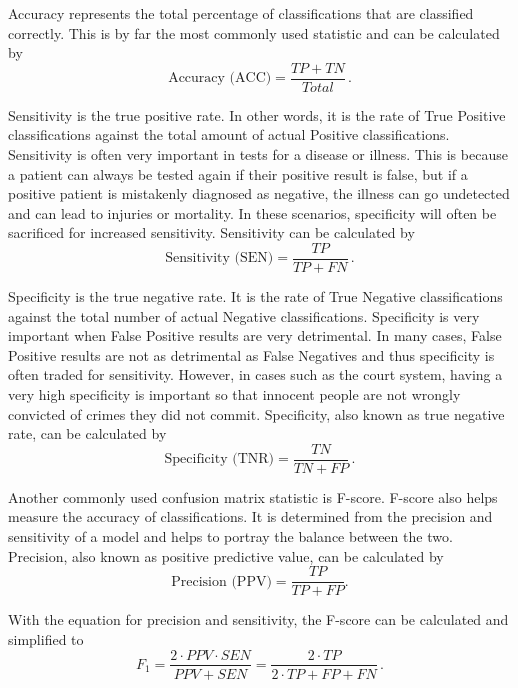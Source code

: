 \documentclass{article}
\begin{document}
Accuracy represents the total percentage of classifications that are classified correctly. This is by far the most commonly used statistic and can be calculated by
\begin{equation}
	\text{Accuracy (ACC)} = \frac{TP + TN}{Total} \,.
\end{equation}

Sensitivity is the true positive rate. In other words, it is the rate of True Positive classifications against the total amount of actual Positive classifications. Sensitivity is often very important in tests for a disease or illness. This is because a patient can always be tested again if their positive result is false, but if a positive patient is mistakenly diagnosed as negative, the illness can go undetected and can lead to injuries or mortality. In these scenarios, specificity will often be sacrificed for increased sensitivity. Sensitivity can be calculated by
\begin{equation}
	\text{Sensitivity (SEN)} = \frac{TP}{TP + FN} \, .
\end{equation}

Specificity is the true negative rate. It is the rate of True Negative classifications against the total number of actual Negative classifications. Specificity is very important when False Positive results are very detrimental. In many cases, False Positive results are not as detrimental as False Negatives and thus specificity is often traded for sensitivity. However, in cases such as the court system, having a very high specificity is important so that innocent people are not wrongly convicted of crimes they did not commit. Specificity, also known as true negative rate, can be calculated by
\begin{equation}
	\text{Specificity (TNR)} = \frac{TN}{TN + FP} \, .
\end{equation}

Another commonly used confusion matrix statistic is F-score. F-score also helps measure the accuracy of classifications. It is determined from the precision and sensitivity of a model and helps to portray the balance between the two. Precision, also known as positive predictive value, can be calculated by
\begin{equation}
	\text{Precision (PPV)} = \frac{TP}{TP + FP} .
\end{equation}

With the equation for precision and sensitivity, the F-score can be calculated and simplified to
\begin{equation}
	F_1 = \frac{2 \cdot PPV \cdot SEN}{PPV + SEN} = \frac{2 \cdot TP}{2 \cdot TP + FP + FN}\, .
\end{equation}
\end{document}
